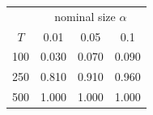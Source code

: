 % 
\begin{tabular}{cccc}
  \hline
  & \multicolumn{3}{c}{nominal size $\alpha$} \\
 $T$ & 0.01 & 0.05 & 0.1 \\
 \hline
100 & 0.030 & 0.070 & 0.090 \\ 
  250 & 0.810 & 0.910 & 0.960 \\ 
  500 & 1.000 & 1.000 & 1.000 \\ 
   \hline
\end{tabular}

